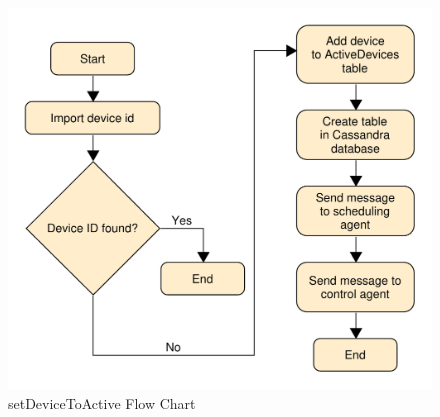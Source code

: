 \begin{figure}[H]
    \centering
    \includegraphics[scale=0.5]{figs/agents/setDeviceToActive.pdf}
    \caption{setDeviceToActive Flow Chart}
    \label{fig:setDeviceToActive}
\end{figure}

